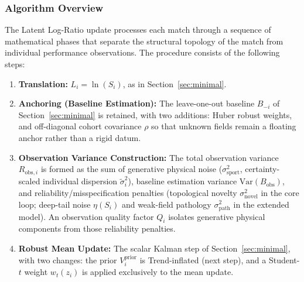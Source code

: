 \documentclass[12pt]{article}
\newcommand{\rhoc}{\rho}        %
\newcommand{\bloo}{B_{-i}}
\begin{document}
	\subsubsection*{Algorithm Overview}
	The Latent Log-Ratio update processes each match through a sequence of mathematical phases that separate the structural topology of the match from individual performance observations. The procedure consists of the following steps:

	\begin{enumerate}
		\item \textbf{Translation:} $L_i = \ln(S_i)$, as in Section~\ref{sec:minimal}.

		\item \textbf{Anchoring (Baseline Estimation):} The leave-one-out baseline $\bloo$ of Section~\ref{sec:minimal} is retained, with two additions: Huber robust weights, and off-diagonal cohort covariance $\rhoc$ so that unknown fields remain a floating anchor rather than a rigid datum.

		\item \textbf{Observation Variance Construction:} The total observation variance \(R_{\mathrm{obs},i}\) is formed as the sum of generative physical noise (\(\sigma_{\mathrm{sport}}^2\), certainty-scaled individual dispersion \(\tilde{\sigma}_i^2\)), baseline estimation variance \(\mathrm{Var}(B_{\mathrm{obs}})\), and reliability/misspecification penalties (topological novelty \(\sigma_{\mathrm{novel}}^2\) in the core loop; deep-tail noise \(\eta(S_i)\) and weak-field pathology \(\sigma_{\mathrm{path}}^2\) in the extended model). An observation quality factor \(Q_i\) isolates generative physical components from those reliability penalties.

		\item \textbf{Robust Mean Update:} The scalar Kalman step of Section~\ref{sec:minimal}, with two changes: the prior $V_i^{\mathrm{prior}}$ is Trend-inflated (next step), and a Student-$t$ weight $w_t(z_i)$ is applied exclusively to the mean update.


\end{enumerate}
\end{document}
